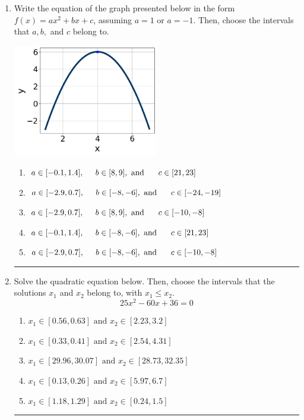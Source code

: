 \documentclass[14pt]{extbook}
\newcommand{\litem}[1]{\item#1\hspace*{-1cm}\rule{\textwidth}{0.4pt}}
\begin{document}
\begin{enumerate}
\litem{
Write the equation of the graph presented below in the form $f(x)=ax^2+bx+c$, assuming  $a=1$ or $a=-1$. Then, choose the intervals that $a, b,$ and $c$ belong to.
\begin{center}
    \includegraphics[width=0.5\textwidth]{../Figures/quadraticGraphToEquationCopyB.png}
\end{center}
\begin{enumerate}[label=\Alph*.]
\item \( a \in [-0.1, 1.4], \hspace*{5mm} b \in [8, 9], \text{ and } \hspace*{5mm} c \in [21, 23] \)
\item \( a \in [-2.9, 0.7], \hspace*{5mm} b \in [-8, -6], \text{ and } \hspace*{5mm} c \in [-24, -19] \)
\item \( a \in [-2.9, 0.7], \hspace*{5mm} b \in [8, 9], \text{ and } \hspace*{5mm} c \in [-10, -8] \)
\item \( a \in [-0.1, 1.4], \hspace*{5mm} b \in [-8, -6], \text{ and } \hspace*{5mm} c \in [21, 23] \)
\item \( a \in [-2.9, 0.7], \hspace*{5mm} b \in [-8, -6], \text{ and } \hspace*{5mm} c \in [-10, -8] \)

\end{enumerate} }
\litem{
Solve the quadratic equation below. Then, choose the intervals that the solutions $x_1$ and $x_2$ belong to, with $x_1 \leq x_2$.\[ 25x^{2} -60 x + 36 = 0 \]\begin{enumerate}[label=\Alph*.]
\item \( x_1 \in [0.56, 0.63] \text{ and } x_2 \in [2.23, 3.2] \)
\item \( x_1 \in [0.33, 0.41] \text{ and } x_2 \in [2.54, 4.31] \)
\item \( x_1 \in [29.96, 30.07] \text{ and } x_2 \in [28.73, 32.35] \)
\item \( x_1 \in [0.13, 0.26] \text{ and } x_2 \in [5.97, 6.7] \)
\item \( x_1 \in [1.18, 1.29] \text{ and } x_2 \in [0.24, 1.5] \)


\end{enumerate}}
\end{enumerate}
\end{document}
